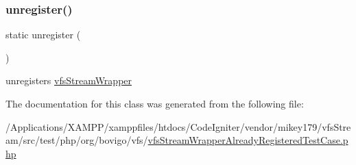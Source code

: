 \subsubsection{\texorpdfstring{unregister()}{unregister()}}
{\footnotesize\ttfamily static unregister (\begin{DoxyParamCaption}{ }\end{DoxyParamCaption})\hspace{0.3cm}{\ttfamily [static]}}

unregisters \mbox{\hyperlink{classorg_1_1bovigo_1_1vfs_1_1vfs_stream_wrapper}{vfs\+Stream\+Wrapper}} 

The documentation for this class was generated from the following file\+:\begin{DoxyCompactItemize}
\item 
/\+Applications/\+X\+A\+M\+P\+P/xamppfiles/htdocs/\+Code\+Igniter/vendor/mikey179/vfs\+Stream/src/test/php/org/bovigo/vfs/\mbox{\hyperlink{vfs_stream_wrapper_already_registered_test_case_8php}{vfs\+Stream\+Wrapper\+Already\+Registered\+Test\+Case.\+php}}\end{DoxyCompactItemize}
